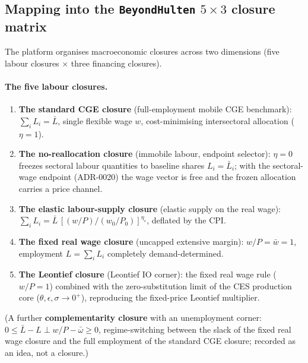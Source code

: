 \subsection{Mapping into the \texttt{BeyondHulten} $5\times3$ closure matrix}\label{app:matrix-map}

The platform organises macroeconomic closures across two dimensions (five
labour closures $\times$ three financing closures).

\paragraph{The five labour closures.}
\begin{enumerate}
\item \textbf{The standard CGE closure} (full-employment mobile CGE benchmark):
  $\sum_i L_i = \bar L$, single flexible wage $w$, cost-minimising
  intersectoral allocation ($\eta = 1$).
\item \textbf{The no-reallocation closure} (immobile labour, endpoint
  selector): $\eta = 0$ freezes
  sectoral labour quantities to baseline shares $L_i = \bar L_i$; with the
  sectoral-wage endpoint (ADR-0020) the wage vector is free and the frozen
  allocation carries a price channel.
\item \textbf{The elastic labour-supply closure} (elastic supply on the real
  wage):
  $\sum_i L_i = \bar L\,[(w/P)/(w_0/P_0)]^{\eta_s}$, deflated by the CPI.
\item \textbf{The fixed real wage closure} (uncapped extensive margin):
  $w/P = \bar w = 1$, employment $L = \sum_i L_i$ completely
  demand-determined.
\item \textbf{The Leontief closure} (Leontief IO corner): the fixed real
  wage rule ($w/P = 1$) combined with
  the zero-substitution limit of the CES production core
  ($\theta, \epsilon, \sigma \to 0^+$), reproducing the fixed-price Leontief
  multiplier.
\end{enumerate}
(A further \textbf{complementarity closure} with an unemployment corner: $0 \le
\bar L - L \perp w/P -
\bar\omega \ge 0$, regime-switching between the slack of the fixed real
wage closure and the full employment of the standard CGE closure; recorded
as an idea, not a closure.)

